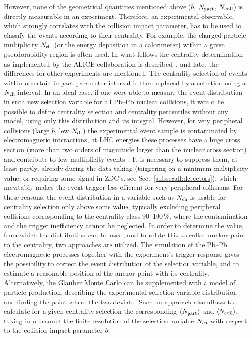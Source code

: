 However, none of the geometrical quantities mentioned above ($b$, $N_{\rm part}$, $N_{\rm coll}$) is directly measurable in an experiment. Therefore, an experimental observable, which strongly correlates with the collision impact parameter, has to be used to classify the events according to their centrality. For example, the charged-particle multiplicity $N_{\rm ch}$ (or the energy deposition in a calorimeter) within a given pseudorapidity region is often used. In what follows the centrality determination as implemented by the ALICE collaboration is described~\cite{Abelev:2013qoq}, and later the differences for other experiments are mentioned. The centrality selection of events within a certain impact-parameter interval is then replaced by a selection using a $N_{\rm ch}$ interval. In an ideal case, if one were able to measure the event distribution in such new selection variable for all Pb--Pb nuclear collisions, it would be possible to define centrality selection and centrality percentiles without any model, using only this distribution and its integral. However, for very peripheral collisions (large $b$, low $N_{\rm ch}$) the experimental event sample is contaminated by electromagnetic interactions, at LHC energies these processes have  a huge cross section (more than two orders of magnitude larger than the nuclear cross section) and contribute to low multiplicity events~\cite{Bruce:2009bg,ALICE:2012aa}. It is necessary to suppress them, at least partly, already during the data taking (triggering on a minimum multiplicity value, or requiring some signal in ZDC's, see Sec.~\ref{subsecall:detectors}), which inevitably makes the event trigger less efficient for very peripheral collisions. For these reasons, the event distribution in a variable such as $N_{\rm ch}$ is usable for centrality selection only above some value, typically excluding peripheral collisions corresponding to the centrality class 90--100\,\%, where the contamination and the trigger inefficiency cannot be neglected. In order to determine the value, from which the distribution can be used, and to relate this so-called anchor point to the centrality, two approaches are utilized. The simulation of the Pb--Pb electromagnetic processes together with the experiment's trigger response gives the possibility to correct the event distribution of the selection variable, and to estimate a reasonable position of the anchor point with its centrality. Alternatively, the Glauber Monte Carlo can be supplemented with a model of particle production, describing the experimental selection-variable distribution and finding the point where the two deviate. Such an approach also allows to calculate for a given centrality selection the corresponding $\langle N_{\rm part} \rangle$ and $\langle N_{\rm coll} \rangle$, taking into account the finite resolution of the selection variable $N_{\rm ch}$ with respect to the collision impact parameter $b$.

